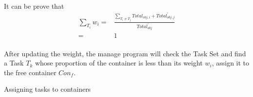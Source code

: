 \documentclass{article}
\begin{document}
                \paragraph{}
                It can be prove that
                \begin{equation}
                    \begin{split}
                        \sum_{T_i}w_i=&\frac{\sum_{T_i\neq T_j}Total_{obj,i}+Total_{obj,j}^{'}}{Total_{obj}^{'}}\\
                            =&1
                    \end{split}
                \end{equation}
                \paragraph{}
                After updating the weight, the manage program will check the Task Set and find a Task $T_k$ whose proportion of the container is less than its weight $w_i$, assign it to the free container $Con_f$.

                \begin{algorithm}[H]
                    \SetAlgoLined
                    \caption{Assigning tasks to containers}
                \end{algorithm}
\end{document}
